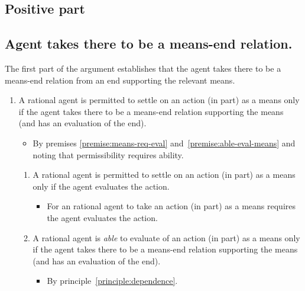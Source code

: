 \documentclass[10pt]{article}
\newcommand{\hozlinedash}[0]{%
  \noindent\hdashrule[0.5ex][c]{\textwidth}{.1pt}{2.5pt}
}
\begin{document}
\subsection{Positive part}
\label{sec:positive-part}

\subsection{Agent takes there to be a means-end relation.}
\label{sec:means-end-relation}

The first part of the argument establishes that the agent takes there to be a means-end relation from an end supporting the relevant means.

\hozlinedash

\begin{enumerate}[label=P\arabic*., ref=(P\arabic*)]
\item A rational agent is permitted to settle on an action (in part) as a means only if the agent takes there to be a means-end relation supporting the means (and has an evaluation of the end).
    \begin{itemize}
    \item By premises \ref{premise:means-req-eval} and~\ref{premise:able-eval-means} and noting that permissibility requires ability.
    \end{itemize}
  \begin{enumerate}[label=P\arabic{enumi}\alph*., ref=(P\arabic{enumi}\alph*)]
  \item A rational agent is permitted to settle on an action (in part) as a means only if the agent evaluates the action.
    \begin{itemize}
    \item For an rational agent to take an action (in part) as a means requires the agent evaluates the action.
    \end{itemize}
  \item A rational agent is \emph{able} to evaluate of an action (in part) as a means only if the agent takes there to be a means-end relation supporting the means (and has an evaluation of the end).
    \begin{itemize}
    \item By principle~\ref{principle:dependence}.
    \end{itemize}
  \end{enumerate}
\end{enumerate}
\end{document}
